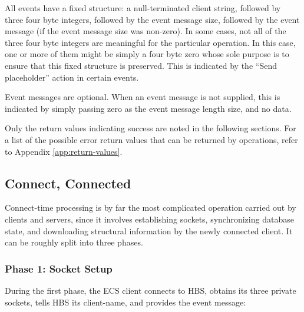 \begin{itemizenoindent}
\item All events have a fixed structure: a null-terminated client string,
  followed by three four byte integers, followed by the event message size,
  followed by the event message (if the event message size was non-zero).  In
  some cases, not all of the three four byte integers are meaningful for the
  particular operation.  In this case, one or more of them might be simply a
  four byte zero whose sole purpose is to ensure that this fixed structure is
  preserved. This is indicated by the ``Send placeholder'' action in certain
  events. 

\item Event messages are optional.  When an event
  message is not supplied, this is indicated by simply passing zero as
  the event message length size, and no data.

\item Only the return values indicating success are noted in the following
sections. For a list of the possible error return values that can be
returned
by operations, refer to Appendix \ref{app:return-values}.

\end{itemizenoindent}

\newpage
\subsection{Connect, Connected}

Connect-time processing is by far the most complicated operation carried
out by clients and servers, since it involves establishing sockets,
synchronizing database state, and downloading structural information by the
newly connected client. It can be roughly split into three phases.

\subsubsection*{Phase 1: Socket Setup}

During the first phase, the ECS client connects to HBS, obtains its three
private sockets, tells HBS its client-name, and provides the event message:

